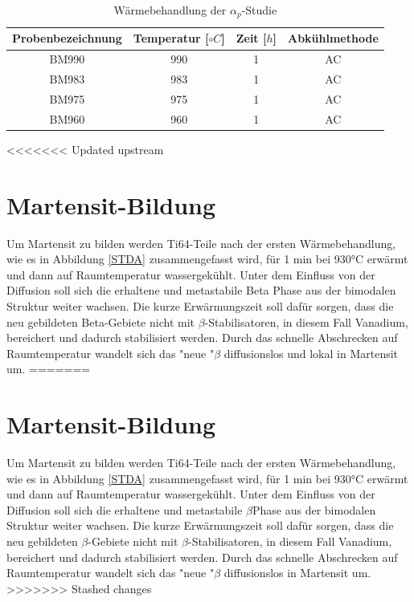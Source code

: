 \begin{table}
		\centering
	\begin{tabular}{|c|c|c|c|}
	\hline 
	Probenbezeichnung & Temperatur [$\circ C$] & Zeit [$h$] & Abkühlmethode \\ 
	\hline 
	BM990 & 990 & 1 & AC\\ 
	\hline 
	BM983 & 983 & 1 & AC\\ 
	\hline 
	BM975 & 975 & 1 & AC\\ 
	\hline 
	BM960 & 960 & 1 & AC\\ 
	\hline 
	\end{tabular} 
	\caption{Wärmebehandlung der $\alpha_p$-Studie}
	\label{tab:alphap}
\end{table}



<<<<<<< Updated upstream

\section{Martensit-Bildung}

Um Martensit zu bilden werden Ti64-Teile  nach der ersten Wärmebehandlung, wie es in Abbildung \ref{STDA} zusammengefasst wird, für 1 min  bei 930°C erwärmt und dann  auf Raumtemperatur wassergekühlt. Unter dem Einfluss von der Diffusion soll sich die erhaltene und metastabile Beta Phase aus der bimodalen Struktur weiter wachsen. Die kurze Erwärmungszeit soll dafür sorgen, dass die neu gebildeten Beta-Gebiete nicht mit $\beta$-Stabilisatoren, in diesem Fall Vanadium, bereichert  und dadurch stabilisiert werden. Durch das schnelle Abschrecken auf Raumtemperatur wandelt sich das "neue "$\beta$ diffusionslos und lokal in Martensit um. 
=======


\section{Martensit-Bildung}


	



Um Martensit zu bilden werden Ti64-Teile  nach der ersten Wärmebehandlung, wie es in Abbildung \ref{STDA} zusammengefasst wird, für 1 min  bei 930°C erwärmt und dann  auf Raumtemperatur wassergekühlt. Unter dem Einfluss von der Diffusion soll sich die erhaltene und metastabile $\beta$Phase aus der bimodalen Struktur weiter wachsen. Die kurze Erwärmungszeit soll dafür sorgen, dass die neu gebildeten $\beta$-Gebiete nicht mit $\beta$-Stabilisatoren, in diesem Fall Vanadium, bereichert  und dadurch stabilisiert werden. Durch das schnelle Abschrecken auf Raumtemperatur wandelt sich das "neue "$\beta$ diffusionslos in Martensit um. 
>>>>>>> Stashed changes

